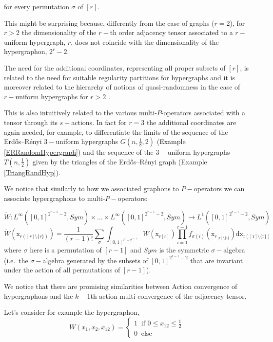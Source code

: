 \documentclass[11pt]{article}
\begin{document}
for every permutation $\sigma$ of $[r]$.

This might be surprising because, differently from the case of graphs ($r=2$), for $r>2$ the dimensionality of the $r-$th order adjacency tensor associated to a $r-$uniform hypergraph, $r$,  does not coincide with the dimensionality of the hypergraphon, $2^r-2$.

The need for the additional coordinates, representing all proper subsets of $[r]$, is related to the need for suitable regularity partitions for hypergraphs \cite{GowersHypRegularity,RodlHyperReg1, RodlHyperReg2}  and it is moreover related to the hierarchy of notions of quasi-randomness in the case of $r-$uniform hypergraphs for $r>2$  \cite{RandomneLimitTow}.

This is also intuitively related to the various multi-$P$-operators associated with a tensor through its $s-$actions. In fact for $r=3$ the additional coordinates are again needed, for example, to differentiate the limits of the sequence of the Erdős–Rényi $3-$uniform hypergraphs $G(n,\frac{1}{8},2)$ (Example \ref{ERRandomHypergraph}) and the sequence of the $3-$uniform hypergraphs $T(n,\frac{1}{2})$ given by the triangles of the Erdős–Rényi graph (Example \ref{TriangRandHyp}).



We notice that similarly to how we associated graphons to $P-$operators we can associate hypergraphons to multi-$P-$operators:

$$
\widetilde{W}:L^{\infty}([0,1]^{2^{r-1}-2},Sym)\times \ldots \times L^{\infty}([0,1]^{2^{r-1}-2},Sym)\longrightarrow L^1([0,1]^{2^{r-1}-2},Sym)
$$
$$
\widetilde{W}(\mathrm{x}_{r([r]\setminus \{r\})})=\frac{1}{(r-1)!}\sum_{\sigma}\int_{[0,1]^{2^r-2^{r-1}}}W(\mathrm{x}_{r[r]})\prod^{r-1}_{i=1} f_{\sigma(i)}(\mathrm{x}_{r_{[r]\setminus\{i\}}})\mathrm{d\mathrm{x}_{r([r]\setminus\{r\})}}
$$
where $\sigma$ here is a permutation of $[r-1]$ and $Sym$ is the symmetric $\sigma-$algebra (i.e.\ the $\sigma-$algebra generated by the subsets of  $[0,1]^{2^{r-1}-2}$ that are invariant under the action of all permutations of $[r-1]$).

We notice that there are promising similarities between Action convergence of hypergraphons and the $k-1$th action multi-convergence of the adjacency tensor.

Let's consider for example the hypergraphon,
$$
W(x_1,x_2,x_{12})=\begin{cases}
    1 \ \text{ if } 0\leq x_{12}\leq \frac{1}{2}\\
    0 \ \text{ else}
\end{cases}
$$
\end{document}
